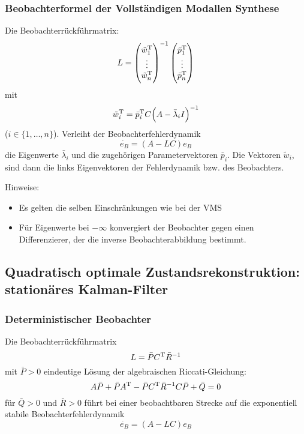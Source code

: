 \subsubsection{Beobachterformel der Vollständigen Modallen Synthese}
Die Beobachterrückführmatrix:
\begin{equation}
    L = {\begin{pmatrix} {\tilde{w}_1}^\text{T} \\ \vdots \\ {\tilde{w}_n}^\text{T} \end{pmatrix}}^{-1}
        \begin{pmatrix} {\bar{p}_1}^\text{T} \\ \vdots \\ {\bar{p}_n}^\text{T} \end{pmatrix}
\end{equation}
mit
\begin{equation}
    {\tilde{w}_i}^\text{T} = {\bar{p}_i}^\text{T} C {\left(A-\bar{\lambda}_i I\right)}^{-1}
\end{equation}
($i \in \{1, \ldots, n\}$). Verleiht der Beobachterfehlerdynamik
\begin{equation}
    \dot{e_B} = (A-LC) e_B
\end{equation}
die Eigenwerte $\bar{\lambda}_i$ und die zugehörigen Parametervektoren $\bar{p}_i$. Die
Vektoren $\tilde{w}_i$, sind dann die links Eigenvektoren der Fehlerdynamik bzw. des
Beobachters.

Hinweise:
\begin{itemize}
    \item Es gelten die selben Einschränkungen wie bei der VMS
    \item Für Eigenwerte bei $-\infty$ konvergiert der Beobachter gegen einen
        Differenzierer, der die inverse Beobachterabbildung bestimmt.
\end{itemize}

\subsection{Quadratisch optimale Zustandsrekonstruktion: stationäres Kalman-Filter}
\subsubsection{Deterministischer Beobachter}
Die Beobachterrückführmatrix
\begin{equation}
    L = \bar{P}{C}^\text{T}\bar{R}^{-1}
\end{equation}
mit $\bar{P}>0$ eindeutige Lösung der algebraischen Riccati-Gleichung:
\begin{equation}
    A\bar{P}+\bar{P}{A}^\text{T}-\bar{P}{C}^\text{T}{\bar{R}}^{-1}C\bar{P}+\bar{Q}=0
\end{equation}
für $\bar{Q}>0$ und $\bar{R}>0$ führt bei einer beobachtbaren Strecke auf die exponentiell
stabile Beobachterfehlerdynamik
\begin{equation}
    \dot{e_B} = (A-LC)e_B
\end{equation}

